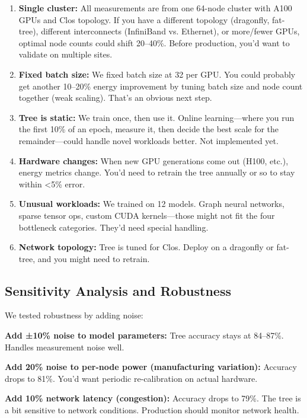 \documentclass[conference]{IEEEtran}
\begin{document}
\begin{enumerate}
\item \textbf{Single cluster:} All measurements are from one 64-node cluster with A100 GPUs and Clos topology. If you have a different topology (dragonfly, fat-tree), different interconnects (InfiniBand vs. Ethernet), or more/fewer GPUs, optimal node counts could shift 20--40\%. Before production, you'd want to validate on multiple sites.

\item \textbf{Fixed batch size:} We fixed batch size at 32 per GPU. You could probably get another 10--20\% energy improvement by tuning batch size and node count together (weak scaling). That's an obvious next step.

\item \textbf{Tree is static:} We train once, then use it. Online learning---where you run the first 10\% of an epoch, measure it, then decide the best scale for the remainder---could handle novel workloads better. Not implemented yet.

\item \textbf{Hardware changes:} When new GPU generations come out (H100, etc.), energy metrics change. You'd need to retrain the tree annually or so to stay within <5\% error.

\item \textbf{Unusual workloads:} We trained on 12 models. Graph neural networks, sparse tensor ops, custom CUDA kernels---those might not fit the four bottleneck categories. They'd need special handling.

\item \textbf{Network topology:} Tree is tuned for Clos. Deploy on a dragonfly or fat-tree, and you might need to retrain.
\end{enumerate}

\subsection{Sensitivity Analysis and Robustness}

We tested robustness by adding noise:

\textbf{Add ±10\% noise to model parameters:} Tree accuracy stays at 84--87\%. Handles measurement noise well.

\textbf{Add 20\% noise to per-node power (manufacturing variation):} Accuracy drops to 81\%. You'd want periodic re-calibration on actual hardware.

\textbf{Add 10\% network latency (congestion):} Accuracy drops to 79\%. The tree is a bit sensitive to network conditions. Production should monitor network health.
\end{document}
